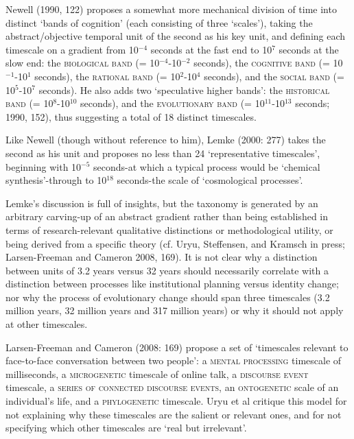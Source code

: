 Newell (1990, 122) proposes a somewhat more mechanical division of time 
into distinct \textquoteleft bands of cognition' (each consisting of three \textquoteleft scales'), 
taking the abstract/objective temporal unit of the second as his key 
unit, and defining each timescale on a gradient from 10$^{-4}$ 
seconds at the fast end to 10$^{7}$ seconds at the slow end: the 
\textsc{biological band} (= 10$^{-4}$-10$^{-2}$ seconds), the 
\textsc{cognitive band} (= 10$^{-1}$-10$^{1}$ seconds), the 
\textsc{rational band} (= 10$^{2}$-10$^{4}$ seconds), and the 
\textsc{social band} (= 10$^{5}$-10$^{7}$ seconds). He also 
adds two \textquoteleft speculative higher bands': the \textsc{historical band} (= 
10$^{8}$-10$^{10}$ seconds), and the \textsc{evolutionary band} 
(= 10$^{11}$-10$^{13}$ seconds; 1990, 152), thus suggesting a 
total of 18 distinct timescales. 



Like Newell (though without reference to him), Lemke (2000: 277) takes 
the second as his unit and proposes no less than 24 \textquoteleft representative 
timescales', beginning with 10$^{-5}$ seconds-at which a typical 
process would be \textquoteleft chemical synthesis'-through to 10$^{18}$ 
seconds-the scale of \textquoteleft cosmological processes'. 



Lemke's discussion is full of insights, but the taxonomy is generated by 
an arbitrary carving-up of an abstract gradient rather than being 
established in terms of research-relevant qualitative distinctions or 
methodological utility, or being derived from a specific theory (cf. 
Uryu, Steffensen, and Kramsch in press; Larsen-Freeman and Cameron 2008, 
169). It is not clear why a distinction between units of 3.2 years 
versus 32 years should necessarily correlate with a distinction between 
processes like institutional planning versus identity change; nor why 
the process of evolutionary change should span three timescales (3.2 
million years, 32 million years and 317 million years) or why it should 
not apply at other timescales. 



Larsen-Freeman and Cameron (2008: 169) propose a set of \textquoteleft timescales 
relevant to face-to-face conversation between two people': a \textsc{
mental processing }timescale of milliseconds, a \textsc{microgenetic }
timescale of online talk, a \textsc{discourse event} timescale, a 
\textsc{series of connected discourse events}, an \textsc{
ontogenetic }scale of an individual's life, and a \textsc{phylogenetic
} timescale. Uryu et al critique this model for not explaining why these 
timescales are the salient or relevant ones, and for not specifying 
which other timescales are \textquoteleft real but irrelevant'. 



